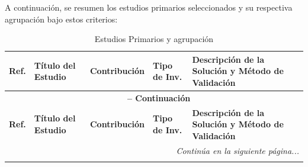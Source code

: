 A continuación, se resumen los estudios primarios seleccionados y su respectiva agrupación bajo estos criterios:

\renewcommand{\arraystretch}{1.4}
\begin{longtable}{@{} c >{\raggedright\arraybackslash}p{4cm} l l >{\raggedright\arraybackslash}p{5.5cm} @{}}
	\caption{Estudios Primarios y agrupación} \\
	\toprule
	\textbf{Ref.} & \textbf{Título del Estudio} & \textbf{Contribución} & \textbf{Tipo de Inv.} & \textbf{Descripción de la Solución y Método de Validación} \\
	\midrule
	\endfirsthead
	
	\multicolumn{5}{c}{\textbf{\tablename\ \thetable\ -- Continuación}} \\
	\toprule
	\textbf{Ref.} & \textbf{Título del Estudio} & \textbf{Contribución} & \textbf{Tipo de Inv.} & \textbf{Descripción de la Solución y Método de Validación} \\
	\midrule
	\endhead
	
	\midrule
	\multicolumn{5}{r}{\textit{Continúa en la siguiente página...}} \\
	\endfoot
	
	\bottomrule
	\endlastfoot
	

\end{longtable}
